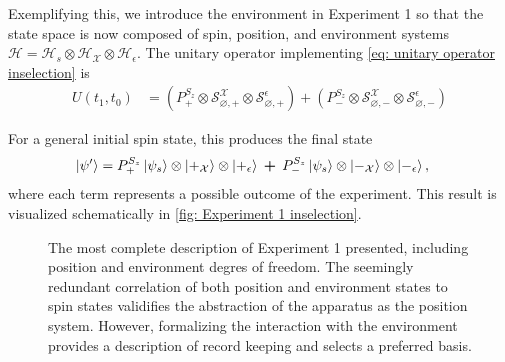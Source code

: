 Exemplifying this, we introduce the environment in Experiment 1 so that the state space is now composed of spin, position, and environment systems $\mathcal{H} = \mathcal{H}_s \otimes \mathcal{H}_\mathcal{X} \otimes \mathcal{H}_\epsilon$. The unitary operator implementing \autoref{eq: unitary operator inselection} is
\begin{align} \label{einselection experiment 1}
  U(t_1, t_0) &= \left(P^{S_z}_+ \otimes \mathcal{S}^\mathcal{X}_{\varnothing, +} \otimes \mathcal{S}^\epsilon_{\varnothing, +} \right) + \left(P^{S_z}_- \otimes \mathcal{S}^\mathcal{X}_{\varnothing, -} \otimes \mathcal{S}^\epsilon_{\varnothing, -} \right)
\end{align}

For a general initial spin state, this produces the final state
\begin{align} \label{einselection experiment 1 state}
  \ket{\psi'} &= P^{S_z}_+ \ket{\psi_s} \otimes \ket{+_{\mathcal{X}}} \otimes \ket{+_\epsilon} \: \bm{+} \: P^{S_z}_- \ket{\psi_s} \otimes \ket{-_{\mathcal{X}}} \otimes \ket{-_\epsilon},
\end{align}
where each term represents a possible outcome of the experiment. This result is visualized schematically in \autoref{fig: Experiment 1 inselection}.

\begin{figure}
\centering\CaptionFontSize
{}
\caption[Insert an abbreviated caption here to show in the List of Figures]
{The most complete description of Experiment 1 presented, including position and environment degres of freedom. The seemingly redundant correlation of both position and environment states to spin states validifies the abstraction of the apparatus as the position system. However, formalizing the interaction with the environment provides a description of record keeping and selects a preferred basis.}
\label{fig: Experiment 1 inselection}
\end{figure}

